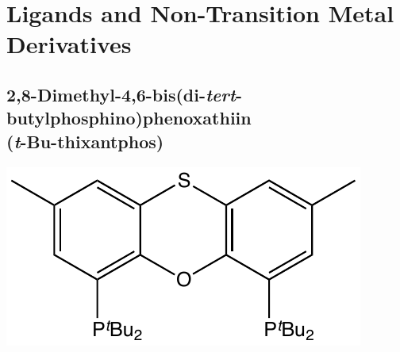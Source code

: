 

\section{Ligands and Non-Transition Metal Derivatives}
\label{section:experimental:ligands}

\subsection*{2,8-Dimethyl-4,6-bis(di-\emph{tert}-butylphosphino)phenoxathiin \\(\emph{t}-Bu-thixantphos)}

\begin{structure}
\begin{center}
\includegraphics[scale=0.7]{../Structures/SP(tBu)2_ligand.pdf}
\end{center}
\end{structure}

